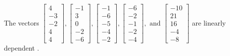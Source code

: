 \begin{exercise}
\begin{exerciseStatement}
  \end{exerciseStatement}
  \begin{exerciseAnswer}
   The vectors \(\left[\begin{array}{r}
4 \\
-3 \\
-2 \\
4 \\
4
\end{array}\right] , \left[\begin{array}{r}
-1 \\
3 \\
0 \\
-2 \\
-6
\end{array}\right] , \left[\begin{array}{r}
-1 \\
-6 \\
-5 \\
-4 \\
-2
\end{array}\right] , \left[\begin{array}{r}
-6 \\
-2 \\
-1 \\
-2 \\
-4
\end{array}\right] , \text{ and } \left[\begin{array}{r}
-10 \\
21 \\
16 \\
-4 \\
-8
\end{array}\right]\) are 
  	 linearly dependent  .
  


  \end{exerciseAnswer}
\end{exercise}